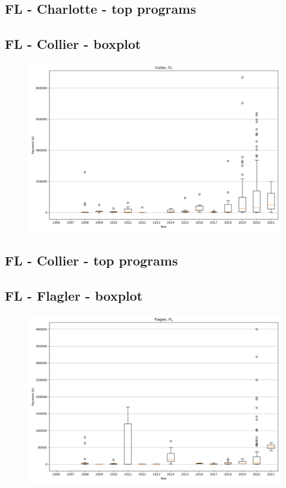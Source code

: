 \subsection*{FL - Charlotte - top programs}

\newpage
\subsection*{FL - Collier - boxplot}
\begin{figure}[h]
\centering
\includegraphics[width=7in]{../output/boxplots/counties/Collier-FL_boxplot.png}
\end{figure}


\subsection*{FL - Collier - top programs}

\newpage
\subsection*{FL - Flagler - boxplot}
\begin{figure}[h]
\centering
\includegraphics[width=7in]{../output/boxplots/counties/Flagler-FL_boxplot.png}
\end{figure}


